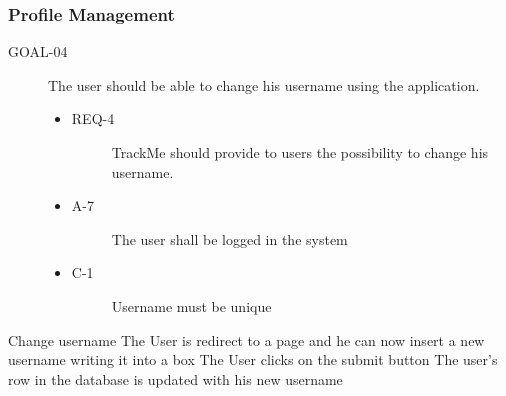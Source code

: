 \documentclass[a4paper]{article}
\newcommand{\requirement}{\ding{229}}%
\begin{document}
        
        \subsubsection{Profile Management }
        
        \begin{description}
        	\item[GOAL-04] The user should be able to change his username using the application. 
            	\begin{itemize}
            	    \item[\requirement]
                	\begin{description}
                	\item[REQ-4] TrackMe should provide to users the possibility to change his username. 
                	\end{description}
                	\item
                	\begin{description}
                	\item[A-7] The user shall be logged in the system
                	\end{description}
                	\item
                	\begin{description}
                	\item[C-1] Username must be unique
                	\end{description}
                	\end{itemize}
        \end{description}
        
        
        
       \begin{usecase}{Change username}
              {The User is redirect to a page and he can now insert a new username writing it into a box}
              {The User clicks on the submit button}
              {The user's row in the database is updated with his new username}
       \end{usecase}
       
\end{document}
